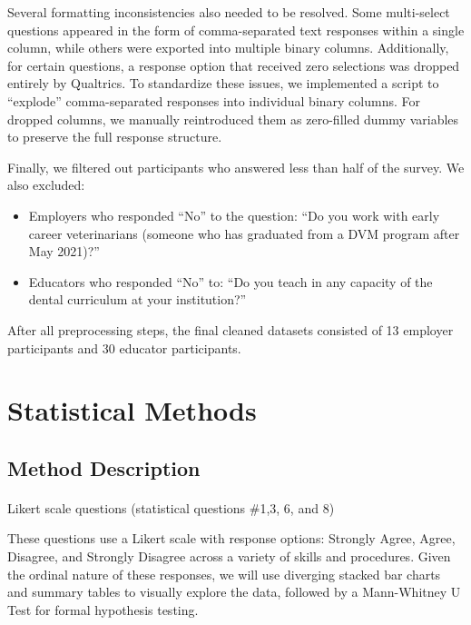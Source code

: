 \documentclass[
  11pt,
  letterpaper,
  DIV=11,
  numbers=noendperiod]{scrartcl}
\makeatletter
\let\oldparagraph\paragraph
\renewcommand{\paragraph}{
    \@ifstar
      \xxxParagraphStar
      \xxxParagraphNoStar
  }
\newcommand{\xxxParagraphStar}[1]{\oldparagraph*{#1}\mbox{}}
\newcommand{\xxxParagraphNoStar}[1]{\oldparagraph{#1}\mbox{}}
\numberwithin{figure}{section}
\makeatother
\begin{document}
Several formatting inconsistencies also needed to be resolved. Some
multi-select questions appeared in the form of comma-separated text
responses within a single column, while others were exported into
multiple binary columns. Additionally, for certain questions, a response
option that received zero selections was dropped entirely by Qualtrics.
To standardize these issues, we implemented a script to ``explode''
comma-separated responses into individual binary columns. For dropped
columns, we manually reintroduced them as zero-filled dummy variables to
preserve the full response structure.

Finally, we filtered out participants who answered less than half of the
survey. We also excluded:

\begin{itemize}
\item
  Employers who responded ``No'' to the question: ``Do you work with
  early career veterinarians (someone who has graduated from a DVM
  program after May 2021)?''
\item
  Educators who responded ``No'' to: ``Do you teach in any capacity of
  the dental curriculum at your institution?''
\end{itemize}

After all preprocessing steps, the final cleaned datasets consisted of
13 employer participants and 30 educator participants.

\section{Statistical Methods}\label{statistical-methods}

\subsection{Method Description}\label{method-description}

\paragraph{Likert scale questions (statistical questions \#1,3, 6, and
8)}\label{likert-scale-questions-statistical-questions-13-6-and-8}

These questions use a Likert scale with response options: Strongly
Agree, Agree, Disagree, and Strongly Disagree across a variety of skills
and procedures. Given the ordinal nature of these responses, we will use
diverging stacked bar charts and summary tables to visually explore the
data, followed by a Mann-Whitney U Test for formal hypothesis testing.
\end{document}
